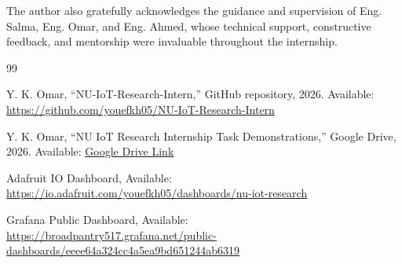 \documentclass[conference]{IEEEtran}
\begin{document}
The author also gratefully acknowledges the guidance and supervision of Eng. Salma, Eng. Omar, and Eng. Ahmed, whose technical support, constructive feedback, and mentorship were invaluable throughout the internship.

\begin{thebibliography}{99}

Y. K. Omar,
``NU-IoT-Research-Intern,''
GitHub repository, 2026.
Available:
\url{https://github.com/youefkh05/NU-IoT-Research-Intern}

Y. K. Omar,
``NU IoT Research Internship Task Demonstrations,''
Google Drive, 2026.
Available: \href{https://drive.google.com/drive/folders/1mi1f_lU7xuAddAbGfxgAJMQLgRbdzmwu?usp=sharing}{Google Drive Link}

Adafruit IO Dashboard, Available:
\url{https://io.adafruit.com/youefkh05/dashboards/nu-iot-research}

Grafana Public Dashboard, Available:
\url{https://broadpantry517.grafana.net/public-dashboards/eeee64a324cc4a5ea9bd651244ab6319}


\end{thebibliography}
\end{document}

